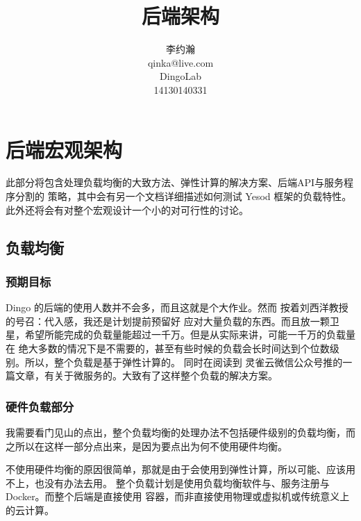 







\makeatletter
\def\@NoStyleChaper{\ralex} %
\def\@ARCHDoc{\ralex} %
\def\@UsingAppendix{\ralex} %
\def\@DocType{article}
\def\@DocTypeCTEX{ctexart}
\makeatother


\doclass

\title{后端架构}
\author{李约瀚 \\ qinka@live.com \\ DingoLab \\ 14130140331}

\part{后端宏观架构}

此部分将包含处理负载均衡的大致方法、弹性计算的解决方案、后端API与服务程序分割的
策略，其中会有另一个文档详细描述如何测试 Yesod 框架的负载特性。
此外还将会有对整个宏观设计一个小的对可行性的讨论。


\chapter{负载均衡}
\section{预期目标}
Dingo 的后端的使用人数并不会多，而且这就是个大作业。然而 按着刘西洋教授的号召：代入感，我还是计划提前预留好
应对大量负载的东西。而且放一颗卫星，希望所能完成的负载量能超过一千万。但是从实际来讲，可能一千万的负载量在
绝大多数的情况下是不需要的，甚至有些时候的负载会长时间达到个位数级别。所以，整个负载是基于弹性计算的。
同时在阅读到 灵雀云微信公众号推的一篇文章，有关于微服务的。大致有了这样整个负载的解决方案。
\section{硬件负载部分}
我需要看门见山的点出，整个负载均衡的处理办法不包括硬件级别的负载均衡，而之所以在这样一部分点出来，是因为要点出为何不使用硬件均衡。

不使用硬件均衡的原因很简单，那就是由于会使用到弹性计算，所以可能、应该用不上，也没有办法去用。
整个负载计划是使用负载均衡软件与、服务注册与Docker。而整个后端是直接使用 容器，而非直接使用物理或虚拟机或传统意义上的云计算。
